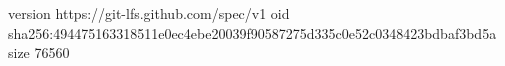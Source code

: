 version https://git-lfs.github.com/spec/v1
oid sha256:494475163318511e0ec4ebe20039f90587275d335c0e52c0348423bdbaf3bd5a
size 76560
